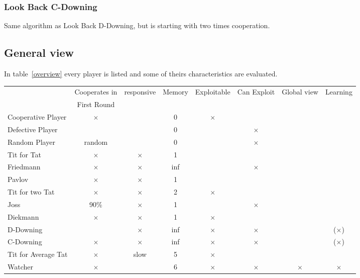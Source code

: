 \documentclass[11pt,twoside]{article}
\renewcommand\headrulewidth{0.4pt}
\begin{document}
\subsubsection{Look Back C-Downing}

Same algorithm as Look Back D-Downing, but is starting with two times cooperation.

\subsection{General view}

In table~\ref{overview} every player is listed and some of theirs characteristics are evaluated. 

 \renewcommand\headrulewidth{0pt}
\fancyhead{} %
\begin{sidewaystable}
\begin{tabular}[]{|l|c|c|c|c|c|c|c|}
  \hline
  			& Cooperates in&responsive& Memory	&Exploitable	& Can Exploit&Global view	&Learning	\\
  			&  First Round&		&      		&		&		&		&		\\
  \hline
  Cooperative Player& $\times$	&		&0		&$\times$	&		&		&		\\
 \hline
  Defective Player 	&  		&		&0		&		&$\times$	&		&		\\
 \hline  
Random Player 	& random	&		&0		&		&$\times$	&		&		\\
 \hline  
Tit for Tat 		& $\times$	&$\times$	&1		&		&		&		&		\\
 \hline
  Friedmann 		& $\times$	&$\times$	&inf		&		&$\times$	&		&		\\
 \hline
 Pavlov		& $\times$	&$\times$	&1		&		&		&		&		\\
 \hline
Tit for two Tat	& $\times$	&$\times$	&2		&$\times$	&		&		&		\\
 \hline
 Joss 			& 90\%	&$\times$	&1		&		&$\times$	&		&		\\
 \hline
Diekmann 		& $\times$	&$\times$	&1		&$\times$	&		&		&		\\
 \hline
D-Downing 		&  		&$\times$	&inf		&$\times$	&$\times$	&		&($\times$)	\\
 \hline
C-Downing 		& $\times$	&$\times$	&inf		&$\times$	&$\times$	&		&($\times$)	\\
 \hline
Tit for Average Tat	& $\times$	&slow		&5		&$\times$	&		&		&		\\
 \hline
Watcher 		& $\times$	&		&6		&$\times$	&$\times$	&$\times$	&$\times$	\\

\end{tabular}
\end{sidewaystable}
\end{document}
